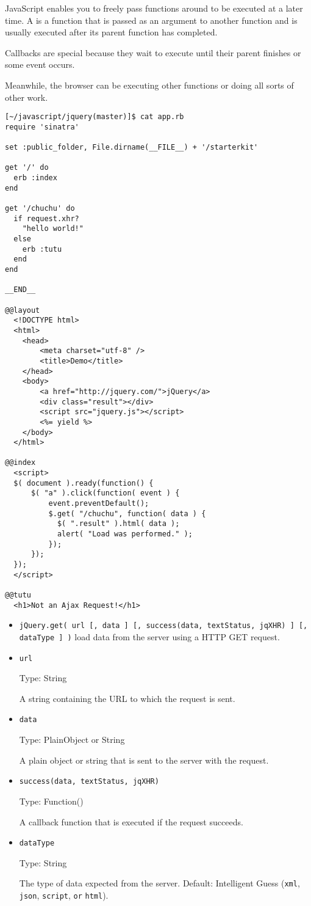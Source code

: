 
JavaScript enables you to freely
pass functions around to be executed at a later time. A  is a
function that is passed as an argument to another function and is usually 
executed
after its parent function has completed. 

Callbacks are special because
they wait to execute until their parent finishes or some event occurs. 

Meanwhile, the
browser can be executing other functions or doing all sorts of other work.
\begin{verbatim}
[~/javascript/jquery(master)]$ cat app.rb
require 'sinatra'

set :public_folder, File.dirname(__FILE__) + '/starterkit'

get '/' do
  erb :index
end

get '/chuchu' do
  if request.xhr?
    "hello world!"
  else 
    erb :tutu
  end
end

__END__

@@layout
  <!DOCTYPE html>
  <html>
    <head>
        <meta charset="utf-8" />
        <title>Demo</title>
    </head>
    <body>
        <a href="http://jquery.com/">jQuery</a>
        <div class="result"></div>
        <script src="jquery.js"></script>
        <%= yield %>
    </body>
  </html>

@@index
  <script>
  $( document ).ready(function() {
      $( "a" ).click(function( event ) {
          event.preventDefault();
          $.get( "/chuchu", function( data ) {
            $( ".result" ).html( data );
            alert( "Load was performed." );
          });
      });
  });
  </script>

@@tutu
  <h1>Not an Ajax Request!</h1>
\end{verbatim}

\begin{itemize}
\item \verb|jQuery.get( url [, data ] [, success(data, textStatus, jqXHR) ] [, dataType ] )|
load data from the server using a HTTP GET request.

\item \verb|url|

Type: String

A string containing the URL to which the request is sent.
\item \verb|data|

Type: PlainObject or String

A plain object or string that is sent to the server with the request.
\item \verb|success(data, textStatus, jqXHR)|

Type: Function()

A callback function that is executed if the request succeeds.
\item \verb|dataType|

Type: String

The type of data expected from the server. Default: Intelligent Guess 
(\verb|xml|, \verb|json|, \verb|script|, \verb|or| \verb|html|).
\end{itemize}

